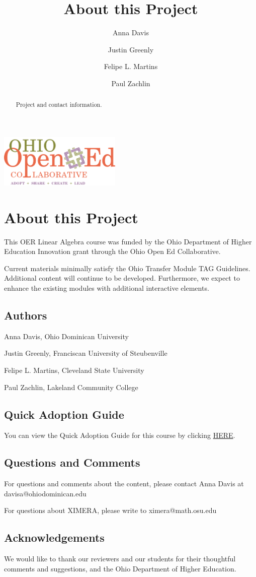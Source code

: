 \documentclass{ximera}
\author{Anna Davis \and Justin Greenly \and Felipe L. Martins \and Paul Zachlin}
\title{About this Project} \license{CC-BY 4.0}
\begin{document}
\begin{abstract}
 Project and contact information.
\end{abstract}
\maketitle

\begin{image}
\includegraphics[height=1in]{ooec.jpg}
\end{image}

\section{About this Project}
This OER Linear Algebra course was funded by the Ohio Department of Higher Education Innovation grant through the Ohio Open Ed Collaborative. 

Current materials minimally satisfy the Ohio Transfer Module TAG Guidelines.  Additional content will continue to be developed.  Furthermore, we expect to enhance the existing modules with additional interactive elements.

\subsection{Authors}
Anna Davis, Ohio Dominican University

Justin Greenly, Franciscan University of Steubenville

Felipe L. Martins, Cleveland State University

Paul Zachlin, Lakeland Community College

\subsection{Quick Adoption Guide}
You can view the Quick Adoption Guide for this course by clicking
\href{https://docs.google.com/document/d/10qFH0S0MzIWAvadk9WHzI1j8xbJg7CKQ0D2J0eVziCM/edit?usp=sharing}{HERE}.

\subsection{Questions and Comments}
For questions and comments about the content, please contact Anna Davis at davisa@ohiodominican.edu

For questions about XIMERA, please write to ximera@math.osu.edu

\subsection{Acknowledgements}
We would like to thank our reviewers and our students for their thoughtful comments and suggestions, and the Ohio Department of Higher Education.
\end{document}
